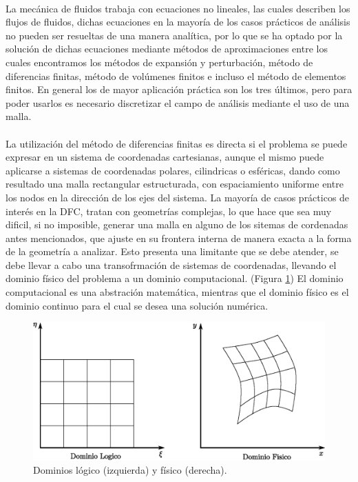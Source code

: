 \documentclass[letterpaper, openright, 12pt]{book}
\begin{document}
    \paragraph*{}
    La mecánica de fluidos trabaja con ecuaciones no lineales, las cuales
    describen los flujos de fluidos, dichas ecuaciones en la mayoría de los
    casos prácticos de análisis no pueden ser resueltas de una manera analítica,
    por lo que se ha optado por la solución de dichas ecuaciones mediante
    métodos de aproximaciones entre los cuales encontramos los métodos de
    expansión y perturbación, método de diferencias finitas, método de volúmenes
    finitos e incluso el método de elementos finitos. En general los de mayor
    aplicación práctica son los tres últimos, pero para poder usarlos es
    necesario discretizar el campo de análisis mediante el uso de una malla.\cite{thompsonhandbook}
    \paragraph*{}
    La utilización del método de diferencias finitas es directa si el problema
    se puede expresar en un sistema de coordenadas cartesianas, aunque el mismo
    puede aplicarse a sistemas de coordenadas polares, cilindricas o esféricas,
    dando como resultado una malla rectangular estructurada, con espaciamiento
    uniforme entre los nodos en la dirección de los ejes del sistema. La mayoría
    de casos prácticos de interés en la DFC, tratan con geometrías complejas,
    lo que hace que sea muy dificil, si no imposible, generar una malla en
    alguno de los sitemas de cordenadas antes mencionados, que ajuste en su
    frontera interna de manera exacta a la forma de la geometría a analizar.
    Esto presenta una limitante que se debe atender, se debe llevar a cabo una
    transofrmación de sistemas de coordenadas, llevando el dominio físico del
    problema a un dominio computacional. (Figura \ref{fig:dominios}) El dominio
    computacional es una abstración matemática, mientras que el dominio físico
    es el dominio continuo para el cual se desea una solución numérica.
    \begin{figure}[htbp!]
        \centering
        \includegraphics[keepaspectratio, width=170mm]{./Imagenes/dominios}
        \caption[Dominios lógico y físico]{Dominios lógico (izquierda) y físico (derecha). \cite{numerical-grid}}
        \label{fig:dominios}
    \end{figure}
\end{document}
